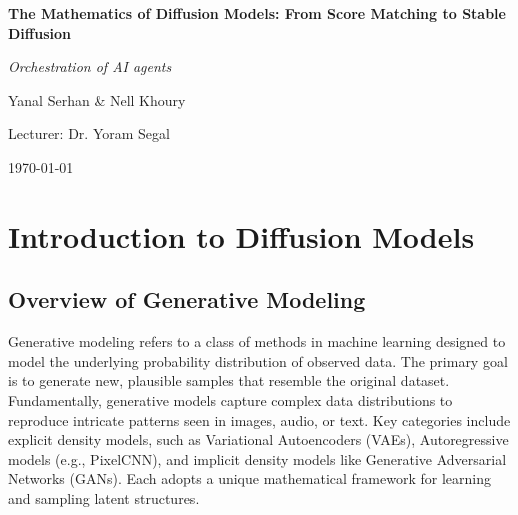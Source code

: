 \documentclass[a4paper,12pt,oneside]{memoir}
\begin{document}
\frontmatter

\begin{titlingpage}
    \centering
    \vspace*{2cm}
    
    {\Huge\bfseries\color{chaptercolor}The Mathematics of Diffusion Models: From Score Matching to Stable Diffusion\par}
    \vspace{0.5cm}
    {\LARGE\itshape Orchestration of AI agents\par}
    
    \vspace{2.5cm}
    
    {\Large Yanal Serhan \& Nell Khoury\par}
    \vspace{0.5cm}
    {\large Lecturer: Dr. Yoram Segal\par}
    
    \vfill
    
    {\large \today\par}
\end{titlingpage}

\begin{abstract}
\noindent Generated book on The Mathematics of Diffusion Models: From Score Matching to Stable Diffusion.
\end{abstract}

\clearpage
\tableofcontents
\clearpage
\listoffigures
\clearpage
\listoftables

\mainmatter

\chapter{Introduction to Diffusion Models}

\section{Overview of Generative Modeling}

Generative modeling refers to a class of methods in machine learning designed to model the underlying probability distribution of observed data. The primary goal is to generate new, plausible samples that resemble the original dataset. Fundamentally, generative models capture complex data distributions to reproduce intricate patterns seen in images, audio, or text. Key categories include explicit density models, such as Variational Autoencoders (VAEs), Autoregressive models (e.g., PixelCNN), and implicit density models like Generative Adversarial Networks (GANs). Each adopts a unique mathematical framework for learning and sampling latent structures.
\end{document}
